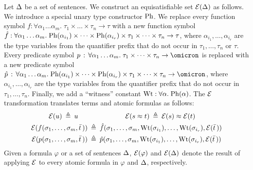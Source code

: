 
Let $\mathrm{\Delta}$ be a set of sentences.
We construct an equisatisfiable set $\mathcal{E}(\mathrm{\Delta})$ as follows.
%
We introduce a special unary type constructor $\mathrm{Ph}$.
We replace every function symbol $f : \forall \alpha_1\dots\alpha_m .\; \tau_1 \times \dots \times \tau_n \to \tau$
with a new function symbol $\hat{f} : \forall \alpha_1\dots\alpha_m .\;
\mathrm{Ph}(\alpha_{i_1}) \times \dots \times \mathrm{Ph}(\alpha_{i_r}) \times
\tau_1 \times \dots \times \tau_n \to \tau$,
where $\alpha_{i_1},\dots,\alpha_{i_r}$ are the type
variables from the quantifier prefix that do not occur in
$\tau_1,\dots,\tau_n$ or $\tau$.
Every predicate symbol $p \,\ty\,
\forall \alpha_1\dots\alpha_m .\;\allowbreak \tau_1 \times \dots \times \tau_n \to \omicron$
is replaced with a new predicate symbol $\hat{p} \,\ty\,
\forall \alpha_1\dots\alpha_m .\;\allowbreak
\ghost(\alpha_{i_1}) \times \dots \times \ghost(\alpha_{i_r}) \times
\tau_1 \times \dots \times \tau_n \to \omicron$,
where $\alpha_{i_1},\dots,\alpha_{i_r}$ are the type
variables from the quantifier prefix that do not occur in
$\tau_1,\dots,\tau_n$.
Finally, we add a ``witness'' constant $\mathrm{Wt} : \forall \alpha.\;\mathrm{Ph}(\alpha)$.
The $\mathcal{E}$ transformation translates terms and atomic
formulas as follows:
\begin{align*}
\ELI(u) \eqdef u
\kern1.4em & \kern5.55em %
\ELI(s \eq t) \eqdef \ELI(s) \eq \ELI(t) \\
\ELI(f(\sigma_1,\dots,\sigma_m,\bar t\,)) &\eqdef
\hat{f}(\sigma_1,\dots,\sigma_m,\wit(\sigma_{i_1}),\dots,\wit(\sigma_{i_r}),
\ELI(\bar t\,)) \\
\ELI(p(\sigma_1,\dots,\sigma_m,\bar t\,)) &\eqdef
\hat{p}(\sigma_1,\dots,\sigma_m,\wit(\sigma_{i_1}),\dots,\wit(\sigma_{i_r}),
\ELI(\bar t\,))
\end{align*}
Given a formula $\varphi$ or a set of sentences $\mathrm{\Delta}$,
$\mathcal{E}(\varphi)$ and $\mathcal{E}(\mathrm{\Delta})$ denote the result of
applying $\mathcal{E}$ to every atomic formula in $\varphi$ and
$\mathrm{\Delta}$, respectively.

